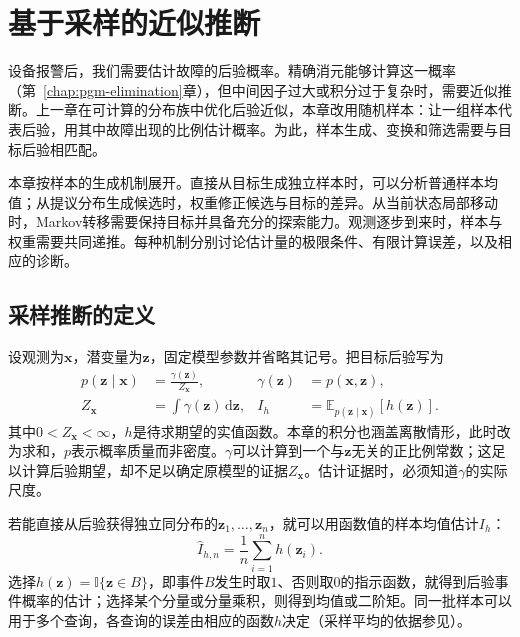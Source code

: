 \chapter{基于采样的近似推断}
\label{chap:pgm-sampling}

设备报警后，我们需要估计故障的后验概率。精确消元能够计算这一概率（第~\ref{chap:pgm-elimination}章），但中间因子过大或积分过于复杂时，需要近似推断。上一章在可计算的分布族中优化后验近似，本章改用随机样本：让一组样本代表后验，用其中故障出现的比例估计概率。为此，样本生成、变换和筛选需要与目标后验相匹配。

本章按样本的生成机制展开。直接从目标生成独立样本时，可以分析普通样本均值；从提议分布生成候选时，权重修正候选与目标的差异。从当前状态局部移动时，Markov转移需要保持目标并具备充分的探索能力。观测逐步到来时，样本与权重需要共同递推。每种机制分别讨论估计量的极限条件、有限计算误差，以及相应的诊断。

\section{采样推断的定义}
\label{sec:pgm-sampling-definition}

设观测为$\bm{x}$，潜变量为$\bm{z}$，固定模型参数并省略其记号。把目标后验写为
\begin{equation}
  \begin{aligned}
    p(\bm{z}\mid\bm{x})&=\frac{\gamma(\bm{z})}{Z_{\bm{x}}},&
    \gamma(\bm{z})&=p(\bm{x},\bm{z}),\\
    Z_{\bm{x}}&=\int\gamma(\bm{z})\,\mathrm{d}\bm{z},&
    I_h&=\mathbb{E}_{p(\bm{z}\mid\bm{x})}[h(\bm{z})].
  \end{aligned}
  \label{eq:pgm-sampling-target}
\end{equation}
其中$0<Z_{\bm{x}}<\infty$，$h$是待求期望的实值函数。本章的积分也涵盖离散情形，此时改为求和，$p$表示概率质量而非密度。$\gamma$可以计算到一个与$\bm{z}$无关的正比例常数；这足以计算后验期望，却不足以确定原模型的证据$Z_{\bm{x}}$。估计证据时，必须知道$\gamma$的实际尺度。

若能直接从后验获得独立同分布的$\bm{z}_1,\ldots,\bm{z}_n$，就可以用函数值的样本均值估计$I_h$：
\begin{equation}
  \widehat I_{h,n}=\frac{1}{n}\sum_{i=1}^{n}h(\bm{z}_i).
  \label{eq:pgm-sampling-direct-estimator}
\end{equation}
选择$h(\bm{z})=\mathbb{I}\{\bm{z}\in B\}$，即事件$B$发生时取$1$、否则取$0$的指示函数，就得到后验事件概率的估计；选择某个分量或分量乘积，则得到均值或二阶矩。同一批样本可以用于多个查询，各查询的误差由相应的函数$h$决定（采样平均的依据参见）。

